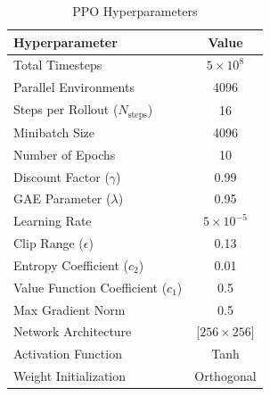 \documentclass[preprint,12pt]{elsarticle}
\begin{document}
\begin{table}[h]
\centering
\caption{PPO Hyperparameters}
\label{tab:ppo_hyperparams}
\begin{tabular}{lc}
\midrule
\textbf{Hyperparameter} & \textbf{Value} \\
\midrule\midrule
Total Timesteps & $5\times 10^8$\\
Parallel Environments & 4096 \\
Steps per Rollout ($N_\text{steps}$) & 16 \\
Minibatch Size & 4096 \\
Number of Epochs & 10 \\
Discount Factor ($\gamma$) & 0.99 \\
GAE Parameter ($\lambda$) & 0.95 \\
Learning Rate & $5 \times 10^{-5}$\\
Clip Range ($\epsilon$) & 0.13 \\
Entropy Coefficient ($c_2$) & 0.01 \\
Value Function Coefficient ($c_1$) & 0.5 \\
Max Gradient Norm & 0.5 \\
Network Architecture & [$256 \times 256$]\\
Activation Function & Tanh \\
Weight Initialization & Orthogonal \\
\midrule
\end{tabular}
\end{table}
\end{document}
